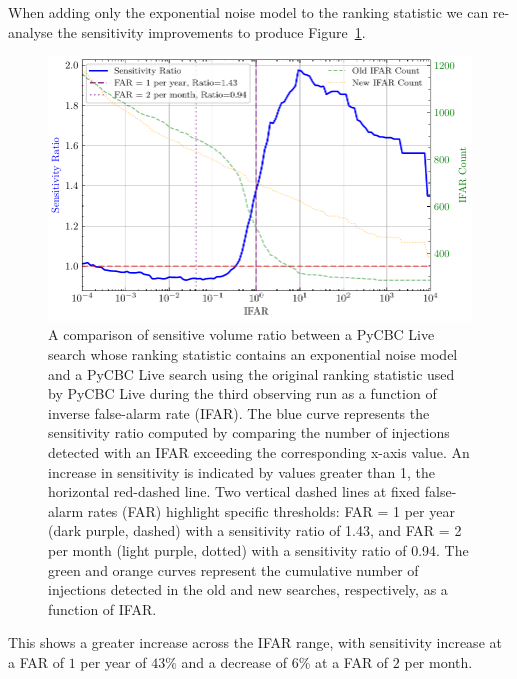 When adding only the exponential noise model to the ranking statistic we can re-analyse the sensitivity improvements to produce Figure~\ref{5:fig:vt-ratio-fits-only}.
%
\begin{figure}
       \centering
    \includegraphics[width=1.0\textwidth]{images/5_pycbclive/plots/fits_only_vt_ratio_with_counts.pdf}
    \caption{A comparison of sensitive volume ratio between a PyCBC Live search whose ranking statistic contains an exponential noise model and a PyCBC Live search using the original ranking statistic used by PyCBC Live during the third observing run as a function of inverse false-alarm rate (IFAR). The blue curve represents the sensitivity ratio computed by comparing the number of injections detected with an IFAR exceeding the corresponding x-axis value. An increase in sensitivity is indicated by values greater than 1, the horizontal red-dashed line. Two vertical dashed lines at fixed false-alarm rates (FAR) highlight specific thresholds: FAR = 1 per year (dark purple, dashed) with a sensitivity ratio of 1.43, and FAR = 2 per month (light purple, dotted) with a sensitivity ratio of 0.94. The green and orange curves represent the cumulative number of injections detected in the old and new searches, respectively, as a function of IFAR.}
    \label{5:fig:vt-ratio-fits-only}
\end{figure}
%
This shows a greater increase across the IFAR range, with sensitivity increase at a FAR of $1$ per year of $43\%$ and a decrease of $6\%$ at a FAR of $2$ per month.

